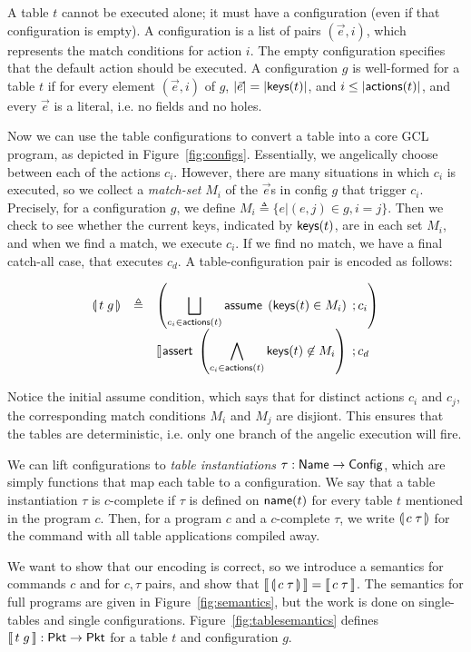A table $t$ cannot be executed alone; it must have a configuration
(even if that configuration is empty). A configuration is a list of
pairs $(\vec e,i)$, which represents the match conditions for action
$i$. The empty configuration specifies that the default action should
be executed. A configuration $g$ is well-formed for a table $t$ if for
every element $(\vec e, i)$ of $g$, $|\vec e| = |\mathsf{keys}(t)|$, and
$i \leq |\mathsf{actions}(t)|$, and every $\vec e$ is a literal, i.e. no fields
and no holes.

Now we can use the table configurations to convert a table into a core GCL
program, as depicted in Figure~\ref{fig:configs}. Essentially, we angelically
choose between each of the actions $c_i$. However, there are many situations in
which $c_i$ is executed, so we collect a \emph{match-set} $M_i$ of the $\vec e$s
in config $g$ that trigger $c_i$. Precisely, for a configuration $g$, we define
$M_i \triangleq \{ e | (e,j) \in g, i = j\}$. Then we check to see whether the
current keys, indicated by $\mathsf{keys}(t)$, are in each set $M_i$, and when we find a
match, we execute $c_i$. If we find no match, we have a final catch-all case,
that executes $c_d$. A table-configuration pair is encoded as follows:

\[ \begin{array}{lcl}
     \llparenthesis\, t\; g\, \rrparenthesis
     & \triangleq
     & \left( \displaystyle \bigsqcup_{c_i \in \mathsf{actions}(t)}
        \mathsf{assume}\; \left(\mathsf{keys}(t) \in M_i\right)\;; c_i\right)\\
     && \displaystyle \talloblong \mathsf{assert}\; \left(\bigwedge_{c_i \in \mathsf{actions}(t)} \mathsf{keys}(t) \not\in M_i\right)\;; c_d
   \end{array}
\]

Notice the initial assume condition, which says that for distinct actions $c_i$
and $c_j$, the corresponding match conditions $M_i$ and $M_j$ are disjiont. This
ensures that the tables are deterministic, i.e. only one branch of the angelic
execution will fire.

We can lift configurations to \emph{table instantiations}
$\tau : \mathsf{Name} \to \mathsf{Config}$, which are simply functions that map each table to a
configuration. We say that a table instantiation $\tau$ is $c$-complete if
$\tau$ is defined on $\mathsf{name}(t)$ for every table $t$ mentioned in the program
$c$. Then, for a program $c$ and a $c$-complete $\tau$, we write
$\llparenthesis\, c\; \tau\, \rrparenthesis$ for the command with all table applications compiled away.

We want to show that our encoding is correct, so we introduce a semantics for
commands $c$ and for $c,\tau$ pairs, and show that
$\llbracket\,\llparenthesis\, c\; \tau\, \rrparenthesis\,\rrbracket = \llbracket\,c\; \tau\,\rrbracket$. The semantics for full
programs are given in Figure~\ref{fig:semantics}, but the work is done on
single-tables and single configurations. Figure~\ref{fig:tablesemantics} defines
$\llbracket\,t\; g\,\rrbracket : \mathsf{Pkt} \to \mathsf{Pkt}$ for a table $t$ and configuration $g$.


